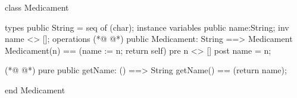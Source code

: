 \begin{vdmpp}[breaklines=true]
class Medicament

types
 public String = seq of (char);
instance variables
  public name:String;
  inv name <> [];
operations
(*@
\label{Medicament:9}
@*)
 public Medicament: String ==> Medicament
  Medicament(n) == (name := n; return self)
 pre n <> []
 post name = n;
 
(*@
\label{getName:14}
@*)
 pure public getName: () ==> String
  getName() == (return name);

end Medicament
\end{vdmpp}

